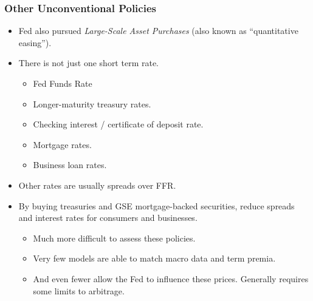 \documentclass[english,xcolor=svgnames]{beamer}
\begin{document}
\begin{frame}
\frametitle{Other Unconventional Policies}

\begin{itemize}
\item Fed also pursued \emph{Large-Scale Asset Purchases} (also known as ``quantitative easing'').
\item There is not just one short term rate.
	\begin{itemize}
		\item Fed Funds Rate
		\item Longer-maturity treasury rates.
		\item Checking interest / certificate of deposit rate.
		\item Mortgage rates.
		\item Business loan rates.
	\end{itemize}
	\item Other rates are usually spreads over FFR.
	\item By buying treasuries and GSE mortgage-backed securities, reduce spreads and interest rates for consumers and businesses.
	\begin{itemize}
		\item Much more difficult to assess these policies.
		\item Very few models are able to match macro data and term premia.
		\item And even fewer allow the Fed to influence these prices. Generally requires some limits to arbitrage.
	\end{itemize}
\end{itemize}	
\end{frame}
\end{document}
